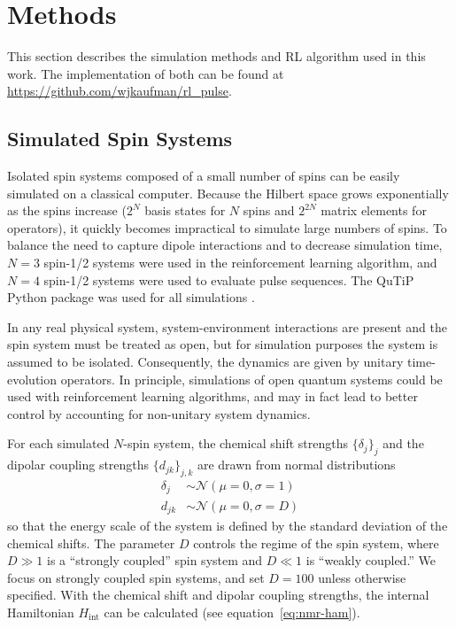 
\chapter{Methods} %



This section describes the simulation methods and RL algorithm used in this work. The implementation of both can be found at \url{https://github.com/wjkaufman/rl_pulse}.

\section{Simulated Spin Systems}

Isolated spin systems composed of a small number of spins can be easily simulated on a classical computer. Because the Hilbert space grows exponentially as the spins increase ($2^N$ basis states for $N$ spins and $2^{2N}$ matrix elements for operators), it quickly becomes impractical to simulate large numbers of spins. To balance the need to capture dipole interactions and to decrease simulation time, $N=3$ spin-1/2 systems were used in the reinforcement learning algorithm, and $N=4$ spin-1/2 systems were used to evaluate pulse sequences. The QuTiP Python package was used for all simulations \cite{Johansson_2013}.

In any real physical system, system-environment interactions are present and the spin system must be treated as open, but for simulation purposes the system is assumed to be isolated.
Consequently, the dynamics are given by unitary time-evolution operators. In principle, simulations of open quantum systems could be used with reinforcement learning algorithms, and may in fact lead to better control by accounting for non-unitary system dynamics.

For each simulated $N$-spin system, the chemical shift strengths $\{\delta_j\}_j$ and the dipolar coupling strengths $\{d_{jk}\}_{j,k}$ are drawn from normal distributions
\begin{align*}
    \delta_j &\sim \mathcal{N}(\mu=0, \sigma=1) \\
    d_{jk} &\sim \mathcal{N}(\mu=0, \sigma=D)
\end{align*}
so that the energy scale of the system is defined by the standard deviation of the chemical shifts. The parameter $D$ controls the regime of the spin system, where $D \gg 1$ is a ``strongly coupled'' spin system and $D \ll 1$ is ``weakly coupled.'' We focus on strongly coupled spin systems, and set $D = 100$ unless otherwise specified. With the chemical shift and dipolar coupling strengths, the internal Hamiltonian $H_{\text{int}}$ can be calculated (see equation~\ref{eq:nmr-ham}).


